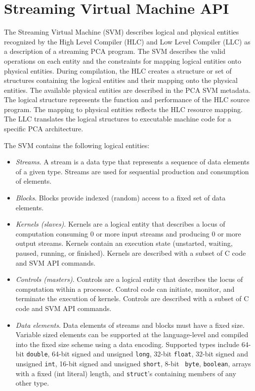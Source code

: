 \section{Streaming Virtual Machine API}

The Streaming Virtual Machine (SVM) describes logical and physical
entities recognized by the High Level Compiler (HLC) and Low Level
Compiler (LLC) as a description of a streaming PCA program.  The SVM
describes the valid operations on each entity and the constraints for
mapping logical entities onto physical entities.  During compilation,
the HLC creates a structure or set of structures containing the
logical entities and their mapping onto the physical entities.  The
available physical entities are described in the PCA SVM metadata.
The logical structure represents the function and performance of the
HLC source program.  The mapping to physical entities reflects the HLC
resource mapping.  The LLC translates the logical structures to
executable machine code for a specific PCA architecture.


The SVM contains the following logical entities:

\begin{itemize}

\item {\it Streams}.  A stream is a data type that represents a
sequence of data elements of a given type.  Streams are used for
sequential production and consumption of elements.

\item {\it Blocks}. Blocks provide indexed (random) access to a fixed
set of data elements.

\item {\it Kernels (slaves)}. Kernels are a logical entity that
describes a locus of computation consuming 0 or more input streams and
producing 0 or more output streams.  Kernels contain an execution
state (unstarted, waiting, paused, running, or finished).  Kernels are
described with a subset of C code and SVM API commands.

\item {\it Controls (masters)}. Controls are a logical entity that
describes the locus of computation within a processor.  Control code
can initiate, monitor, and terminate the execution of kernels.
Controls are described with a subset of C code and SVM API commands.

\item {\it Data elements}. Data elements of streams and blocks must
have a fixed size.  Variable sized elements can be supported at the
language-level and compiled into the fixed size scheme using a data
encoding.  Supported types include 64-bit {\tt double}, 64-bit signed
and unsigned {\tt long}, 32-bit {\tt float}, 32-bit signed and
unsigned {\tt int}, 16-bit signed and unsigned {\tt short}, 8-bit {\tt
byte}, {\tt boolean}, arrays with a fixed (int literal) length, and
{\tt struct}'s containing members of any other type.

\end{itemize}

